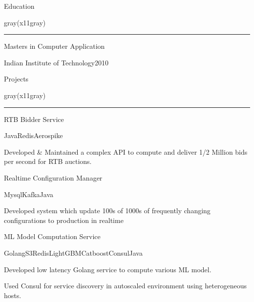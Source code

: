 \documentclass[8pt,a4paper]{article}
\begin{document}
\begin{multicols}{2}
\vspace{4mm}
\begin{section}{Education}
\end{section}
\begin{color}{gray(x11gray)}\hrule\end{color}
\vspace{5mm}
\begin{expsec}{Masters in Computer Application}
\end{expsec}
\begin{expsubsec}{Indian Institute of Technology{\textbar}2010}
\end{expsubsec}
\vspace{4mm}
\begin{section}{Projects}
\end{section}
\begin{color}{gray(x11gray)}\hrule\end{color}
\vspace{5mm}
\begin{expsec}{RTB Bidder Service}
\end{expsec}
\begin{expsubsec}{Java{\textbar}Redis{\textbar}Aerospike}
\end{expsubsec}
\begin{desc}{Developed \& Maintained a complex API to compute and deliver 1/2 Million bids per second for RTB auctions.}
\end{desc}
\begin{expsec}{Realtime Configuration Manager}
\end{expsec}
\begin{expsubsec}{Mysql{\textbar}Kafka{\textbar}Java}
\end{expsubsec}
\begin{desc}{Developed system which update 100s of 1000s of frequently changing configurations to production in realtime}
\end{desc}
\begin{expsec}{ML Model Computation Service}
\end{expsec}
\begin{expsubsec}{Golang{\textbar}S3{\textbar}Redis{\textbar}LightGBM{\textbar}Catboost{\textbar}Consul{\textbar}Java}
\end{expsubsec}
\begin{desc}{Developed low latency Golang service to compute various ML model.}
\end{desc}
\begin{desc}{Used Consul for service discovery in autoscaled environment using heterogeneous hosts. }

\end{desc}
\end{multicols}
\end{document}
